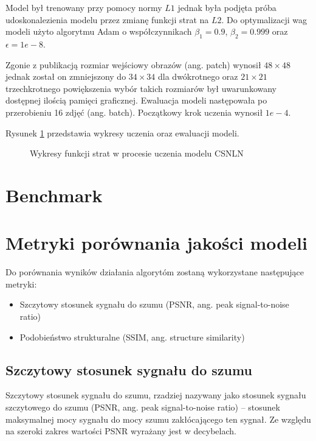 \documentclass[a4paper,12pt,twoside,openany]{report}
\newcommand{\ImgPath}{.}
\begin{document}
Model był trenowany przy pomocy normy $L1$ jednak była podjęta próba udoskonalezienia modelu przez zmianę funkcji strat na $L2$. Do  optymalizacji wag  modeli użyto algorytmu Adam o  współczynnikach $\beta_1=0.9$, $\beta_2=0.999$ oraz $\epsilon=1e-8$. 

Zgonie z publikacją rozmiar  wejściowy obrazów (ang. patch) wynosił $48 \times 48$ jednak został on zmniejszony do $34 \times 34$ dla dwókrotnego oraz $21 \times 21$ trzechkrotnego powiększenia wybór takich rozmiarów był uwarunkowany dostępnej ilością pamięci graficznej. Ewaluacja modeli następowała po przerobieniu 16 zdjęć (ang. batch). Początkowy krok uczenia wynosił $1e-4$. 

Rysunek \ref{CSNLN_uczenie} przedstawia wykresy uczenia oraz ewaluacji modeli. 
\begin{figure}[!htbp]
	
	\begin{center}
		\centering
	\end{center}
	\caption{Wykresy funkcji strat w procesie uczenia modelu CSNLN}
	\label{CSNLN_uczenie}
\end{figure}


\section{Benchmark}

\section{Metryki porównania jakości modeli}
Do porównania wyników działania algorytóm zostaną wykorzystane następujące metryki:
\begin{itemize}
	\item Szczytowy stosunek sygnału do szumu (PSNR, ang. peak signal-to-noise ratio)
	\item Podobieństwo strukturalne (SSIM, ang. structure similarity) 
\end{itemize}
\subsection{Szczytowy stosunek sygnału do szumu}
Szczytowy stosunek sygnału do szumu, rzadziej nazywany jako stosunek sygnału szczytowego do szumu (PSNR, ang. peak signal-to-noise ratio) – stosunek maksymalnej mocy sygnału do mocy szumu zakłócającego ten sygnał. Ze względu na szeroki zakres wartości PSNR wyrażany jest w decybelach. 
\end{document}
